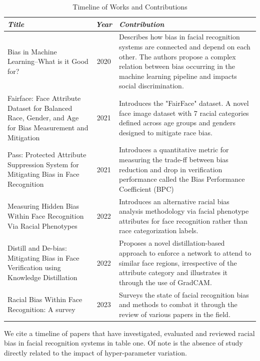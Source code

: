 \documentclass[conference]{IEEEtran}
\begin{document}
\begin{table}[htbp]
\caption{Timeline of Works and Contributions}
\centering
\begin{tabular}{|p{7cm}|c|p{9cm}|}
\hline
\textbf{\textit{Title}} & \textbf{\textit{Year}} & \textbf{\textit{Contribution}} \\
\hline
Bias in Machine Learning--What is it Good for? \cite{hellstrom2020bias} & 2020 & Describes how bias in facial recognition systems are connected and depend on each other. The authors propose a complex relation between bias occurring in the machine learning pipeline and impacts social discrimination. \\
\hline
Fairface: Face Attribute Dataset for Balanced Race, Gender, and Age for Bias Measurement and Mitigation 
\cite{karkkainen2021fairface} & 2021 & Introduces the "FairFace" dataset. A novel face image dataset with 7 racial categories defined across age groups and genders designed to mitigate race bias. \\
\hline
Pass: Protected Attribute Suppression System for Mitigating Bias in Face Recognition\cite{dhar2021pass} & 2021 & Introduces a quantitative metric for measuring the trade-ff between bias reduction and drop in verification performance called the Bias Performance Coefficient (BPC) \\
\hline
Measuring Hidden Bias Within Face Recognition Via Racial Phenotypes \cite{yucer2022measuring} & 2022 & Introduces an alternative racial bias analysis methodology via facial phenotype attributes for face recognition rather than race categorization labels.  \\
\hline
Distill and De-bias: Mitigating Bias in Face Verification using Knowledge Distillation\cite{dhar2022distill} & 2022 & Proposes a novel distillation-based approach to enforce a network to attend to similar face regions, irrespective of the attribute category and illustrates it through the use of GradCAM. \\
\hline
Racial Bias Within Face Recognition: A survey \cite{yucer2023racial} & 2023 & Surveys the state of facial recognition bias and methods to combat it through the review of various papers in the field. \\
\hline
\end{tabular}
\label{tab1}
\end{table}

We cite a timeline of papers that have investigated, evaluated and reviewed racial bias in facial recognition systems in table one. Of note is the absence of study directly related to the impact of hyper-parameter variation.
\end{document}
